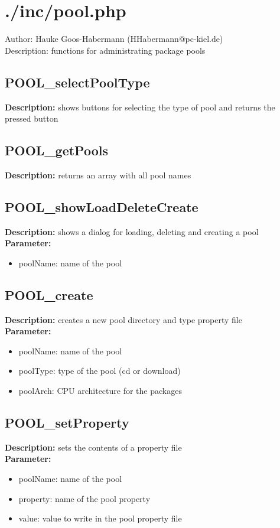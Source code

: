 \newpage\section{./inc/pool.php}
 Author: Hauke Goos-Habermann (HHabermann@pc-kiel.de)\\
 Description: functions for administrating package pools\\

\subsection{POOL\_selectPoolType}
\textbf{Description:} shows buttons for selecting the type of pool and returns the pressed button\\

\subsection{POOL\_getPools}
\textbf{Description:} returns an array with all pool names\\

\subsection{POOL\_showLoadDeleteCreate}
\textbf{Description:} shows a dialog for loading, deleting and creating a pool\\
\textbf{Parameter:}
\begin{itemize}
\item poolName: name of the pool
\end{itemize}

\subsection{POOL\_create}
\textbf{Description:} creates a new pool directory and type property file\\
\textbf{Parameter:}
\begin{itemize}
\item poolName: name of the pool
\item poolType: type of the pool (cd or download)
\item poolArch: CPU architecture for the packages
\end{itemize}

\subsection{POOL\_setProperty}
\textbf{Description:} sets the contents of a property file\\
\textbf{Parameter:}
\begin{itemize}
\item poolName: name of the pool
\item property: name of the pool property
\item value: value to write in the pool property file
\end{itemize}

